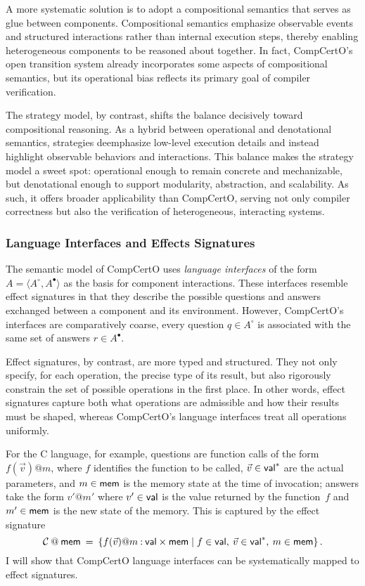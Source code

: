A more systematic solution is to adopt a compositional semantics
that serves as glue between components.
Compositional semantics emphasize observable events and structured interactions
rather than internal execution steps,
thereby enabling heterogeneous components to be reasoned about together.
In fact,
CompCertO's open transition system already
incorporates some aspects of compositional semantics,
but its operational bias reflects
its primary goal of compiler verification.

The strategy model,
by contrast,
shifts the balance decisively toward compositional reasoning.
As a hybrid between operational and denotational semantics,
strategies deemphasize low-level execution details
and instead highlight observable behaviors and interactions.
This balance makes the strategy model a sweet spot:
operational enough to remain concrete and mechanizable,
but denotational enough to support modularity, abstraction, and scalability.
As such, it offers broader applicability than CompCertO,
serving not only compiler correctness
but also the verification of heterogeneous, interacting systems.

\subsubsection{Language Interfaces and Effects Signatures}

The semantic model of CompCertO uses \emph{language interfaces}
of the form $A = \langle A^\circ, A^\bullet \rangle$
as the basis for component interactions.
These interfaces resemble effect signatures
in that they describe the possible questions and answers exchanged
between a component and its environment.
However,
CompCertO's interfaces are comparatively coarse,
every question $q \in A^\circ$ is associated with the same set of answers $r \in A^\bullet$.

Effect signatures,
by contrast,
are more typed and structured.
They not only specify, for each operation,
the precise type of its result,
but also rigorously constrain
the set of possible operations
in the first place.
In other words,
effect signatures capture both
what operations are admissible and
how their results must be shaped,
whereas CompCertO's language interfaces treat all operations uniformly.

For the C language,
for example,
questions are function calls of the form $f(\vec{v})@m$, where
$f$ identifies the function to be called,
$\vec{v} \in  \mathsf{val} ^*$ are the actual parameters, and
$m \in  \mathsf{mem} $ is the memory state at the time of invocation;
answers take the form $v'@m'$ where
$v' \in  \mathsf{val} $ is the value returned by the function~$f$ and
$m' \in  \mathsf{mem} $ is the new state of the memory.
This is captured by the effect signature
\[
  \mathcal{C} \mathbin@ \kw{mem} \:=\:
  \{ f(\vec{v})@m \mathbin: \kw{val} \times \kw{mem} \mid
    f \in \kw{val}, \:
    \vec{v} \in \kw{val}^*, \:
  m \in \kw{mem} \}
  \,.
\]
I will show that CompCertO language interfaces
can be systematically mapped to effect signatures.

